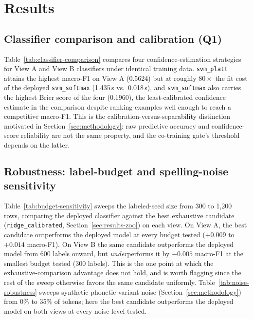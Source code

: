 \documentclass[conference]{IEEEtran}
\begin{document}
\section{Results}
\label{sec:results}

\subsection{Classifier comparison and calibration (Q1)}
\label{sec:results-classifiers}

Table~\ref{tab:classifier-comparison} compares four confidence-estimation
strategies for View A and View B classifiers under identical training data.
\texttt{svm\_platt} attains the highest macro-F1 on View A (0.5624) but at
roughly $80\times$ the fit cost of the deployed \texttt{svm\_softmax}
(1.435\,s vs.\ 0.018\,s), and \texttt{svm\_softmax} also carries the highest
Brier score of the four (0.1960), the least-calibrated confidence estimate in
the comparison despite ranking examples well enough to reach a competitive
macro-F1. This is the calibration-versus-separability
distinction motivated in Section~\ref{sec:methodology}: raw predictive
accuracy and confidence-score reliability are not the same property, and the
co-training gate's threshold depends on the latter.

\subsection{Robustness: label-budget and spelling-noise sensitivity}
\label{sec:results-robustness}

Table~\ref{tab:budget-sensitivity} sweeps the labeled-seed size from 300 to
1{,}200 rows, comparing the deployed classifier against the best exhaustive
candidate (\texttt{ridge\_calibrated}, Section~\ref{sec:results-zoo}) on each
view. On View A, the best candidate outperforms the deployed model at every
budget tested ($+0.009$ to $+0.014$ macro-F1). On View B the same candidate
outperforms the deployed model from 600 labels onward, but \emph{under}performs
it by $-0.005$ macro-F1 at the smallest budget tested (300 labels). This is
the one point at which the exhaustive-comparison advantage does not hold, and
is worth flagging since the rest of the sweep otherwise favors the same
candidate uniformly. Table~\ref{tab:noise-robustness} sweeps synthetic phonetic-variant
noise (Section~\ref{sec:methodology}) from 0\% to 35\% of tokens; here the
best candidate outperforms the deployed model on both views at every noise
level tested.
\end{document}
